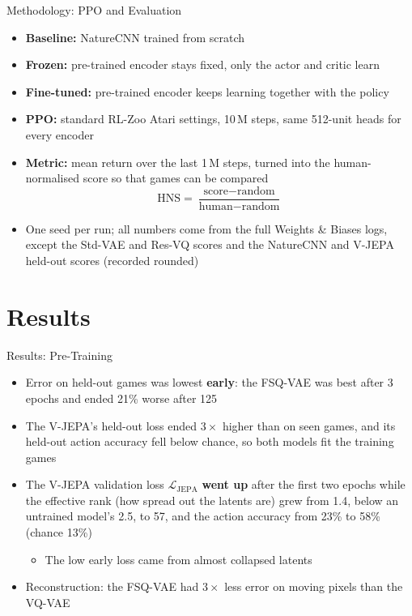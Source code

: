 \documentclass[aspectratio=43,10pt]{beamer}
\begin{document}
\begin{frame}{Methodology: PPO and Evaluation}
  \begin{itemize}\setlength\itemsep{0.55em}
    \item \textbf{Baseline:} NatureCNN trained from scratch
    \item \textbf{Frozen:} pre-trained encoder stays fixed, only the actor and critic learn
    \item \textbf{Fine-tuned:} pre-trained encoder keeps learning together with the policy
    \item \textbf{PPO:} standard RL-Zoo Atari settings, 10\,M steps, same 512-unit heads for
          every encoder
    \item \textbf{Metric:} mean return over the last 1\,M steps, turned into the
          human-normalised score so that games can be compared
      \[\text{HNS}=\frac{\text{score}-\text{random}}{\text{human}-\text{random}}\]
    \item One seed per run; all numbers come from the full Weights \& Biases logs, except the
          Std-VAE and Res-VQ scores and the NatureCNN and V-JEPA held-out scores (recorded
          rounded)
  \end{itemize}
\end{frame}

\section{Results}

\begin{frame}{Results: Pre-Training}
  \begin{itemize}\setlength\itemsep{0.7em}
    \item Error on held-out games was lowest \textbf{early}: the FSQ-VAE was best after 3
          epochs and ended 21\% worse after 125
    \item The V-JEPA's held-out loss ended $3\times$ higher than on seen games, and its
          held-out action accuracy fell below chance, so both models fit the training games
    \item The V-JEPA validation loss $\mathcal{L}_{\text{JEPA}}$ \textbf{went up} after the first
          two epochs while the effective rank (how spread out the latents are) grew from 1.4,
          below an untrained model's 2.5, to 57, and the action accuracy from 23\% to 58\%
          (chance 13\%)
      \begin{itemize}
        \item The low early loss came from almost collapsed latents
      \end{itemize}
    \item Reconstruction: the FSQ-VAE had $3\times$ less error on moving pixels than the VQ-VAE
  \end{itemize}
\end{frame}
\end{document}
